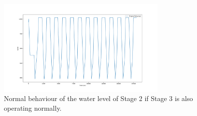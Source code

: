 {{%


\begin{figure}[t]
  \centering
  \includegraphics[width=0.75\textwidth]{Figures/Stage2Normal.png}
  \caption{Normal behaviour of the water level of Stage 2 if Stage 3 is also operating normally.}
  \label{fig:Stage2Normal}
\end{figure}


}}
